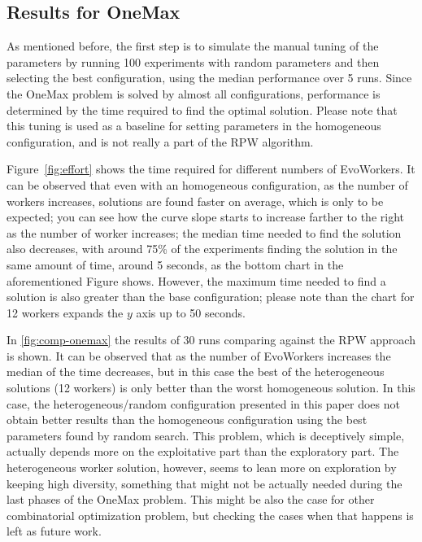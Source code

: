 \documentclass[conference]{IEEEtran}
\begin{document}
  \subsection{Results for OneMax}
  \label{ss:onemax}

As mentioned before, the first step is to simulate the manual tuning of the parameters
by running 100 experiments with random parameters and then selecting the best configuration,
using the median performance over 5 runs. Since the OneMax problem is solved by almost all
configurations, performance is determined by the time required to find
the optimal solution. Please note that this tuning is used as a
baseline for setting parameters in the homogeneous configuration, and
is not really a part of the RPW algorithm. %

Figure~\ref{fig:effort} shows the time required for different numbers of EvoWorkers.
It can be observed that even with an homogeneous configuration, as the number of workers
increases, solutions are found faster on average, which is only to be expected; you can see how the
curve slope starts to increase farther to the right as the number of
worker increases; the median time needed to find the solution also decreases,
with around 75\% of the experiments finding the solution in the same
amount of time, around 5 seconds, as the bottom chart in the
aforementioned Figure shows. However, the maximum time needed to find
a solution is also greater than the base configuration; please note than the chart for 12
workers expands the $y$ axis up to 50 seconds.

In \autoref{fig:comp-onemax} the results of 30 runs comparing against the RPW approach is shown.
It can be observed that as the number of EvoWorkers increases the median of the time decreases, but
in this case the best of the heterogeneous solutions (12 workers) is only better than the worst homogeneous
solution. In this case, the heterogeneous/random configuration
presented in this paper does not obtain better results than the
homogeneous configuration using the best parameters found by random
search. This problem, which is deceptively simple, actually depends
more on the exploitative part than the exploratory part. The
heterogeneous worker solution, however, seems to lean more on
exploration by keeping high diversity, something that might not be
actually needed during the last phases of the OneMax problem. This
might be also the case for other combinatorial optimization problem,
but checking the cases when that happens is left as future work.
\end{document}
